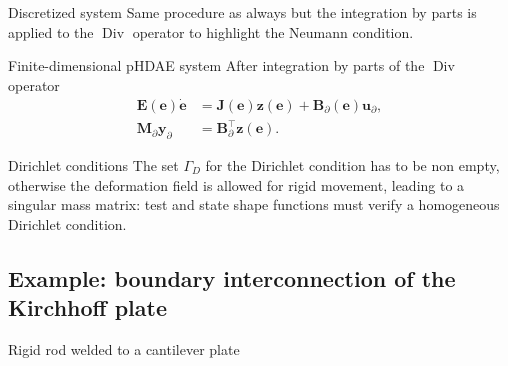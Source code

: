 \documentclass[aspectratio=169]{ISAE-Beamer}
\DeclareMathOperator*{\Div}{Div}
\begin{document}
\begin{frame}{Discretized system}
Same procedure as always but the integration by parts is applied to the $\Div$ operator to highlight the Neumann condition.
\begin{exampleblock}{Finite-dimensional pHDAE system}
	\setlength{\abovedisplayskip}{3pt}
	\setlength{\belowdisplayskip}{3pt}
	After integration by parts of the $\Div$ operator
	\begin{equation*}
	\begin{aligned}
	\mathbf{E}(\mathbf{e}) \dot{\mathbf{e}} &= \mathbf{J}(\mathbf{e}) \mathbf{z}(\mathbf{e}) + \mathbf{B}_\partial(\mathbf{e}) \mathbf{u}_\partial, \\
	\mathbf{M}_\partial \mathbf{y}_\partial &= \mathbf{B}_\partial^\top \mathbf{z}(\mathbf{e}).
	\end{aligned}
	\end{equation*}
\end{exampleblock}

\begin{block}{Dirichlet conditions}
	The set $\Gamma_D$ for the Dirichlet condition has to be non empty, otherwise the deformation field is allowed for rigid movement, leading to a singular mass matrix: test and state shape functions must verify a homogeneous Dirichlet condition. 
\end{block}
\end{frame}

\subsection{Example: boundary interconnection of the Kirchhoff plate}

\begin{frame}{Rigid rod welded to a cantilever plate }
\begin{tcolorbox}
	\centering
\end{tcolorbox}

\end{frame}
\end{document}
